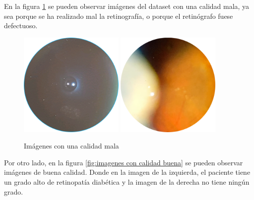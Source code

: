 En la figura \ref{fig:imagenes con calidad mala} se pueden observar imágenes del dataset con una calidad mala, ya sea porque se ha realizado mal la retinografía, o porque el retinógrafo fuese defectuoso.

        \begin{figure}[!ht]
                 \centering
                 \includegraphics[width=0.45\textwidth]{img/dataset/315483GD.png}
                 \includegraphics[width=0.45\textwidth]{img/dataset/365017ED.PNG}
                  \caption{Imágenes con una calidad mala}
                 \label{fig:imagenes con calidad mala}
        \end{figure}

Por otro lado, en la figura \ref{fig:imagenes con calidad buena} se pueden observar imágenes de buena calidad. Donde en la imagen de la izquierda, el paciente tiene un grado alto de retinopatía diabética y la imagen de la derecha no tiene ningún grado.

